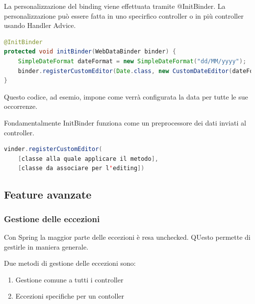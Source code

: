 \documentclass[11pt,a4paper]{book}
\begin{document}
La personalizzazione del binding viene effettuata tramite @InitBinder. La personalizzazione può essere fatta in uno specirfico controller o in più controller usando Handler Advice.
\begin{lstlisting}[language = Java]
@InitBinder
protected void initBinder(WebDataBinder binder) {
	SimpleDateFormat dateFormat = new SimpleDateFormat("dd/MM/yyyy");
	binder.registerCustomEditor(Date.class,	new CustomDateEditor(dateFormat, false));
}
\end{lstlisting}
Questo codice, ad esemio, impone come verrà configurata la data per tutte le sue occorrenze.

Fondamentalmente InitBinder funziona come un preprocessore dei dati inviati al controller.

\begin{lstlisting}[language = Java]
vinder.registerCustomEditor(
	[classe alla quale applicare il metodo], 
	[classe da associare per l'editing])
\end{lstlisting}

\subsection{Feature avanzate}
\subsubsection{Gestione delle eccezioni}
Con Spring la maggior parte delle eccezioni è resa unchecked. QUesto permette di gestirle in maniera generale.

Due metodi di gestione delle eccezioni sono:
\begin{enumerate}
	\item Gestione comune a tutti i controller
	\item Eccezioni specifiche per un contoller
\end{enumerate}
\end{document}
